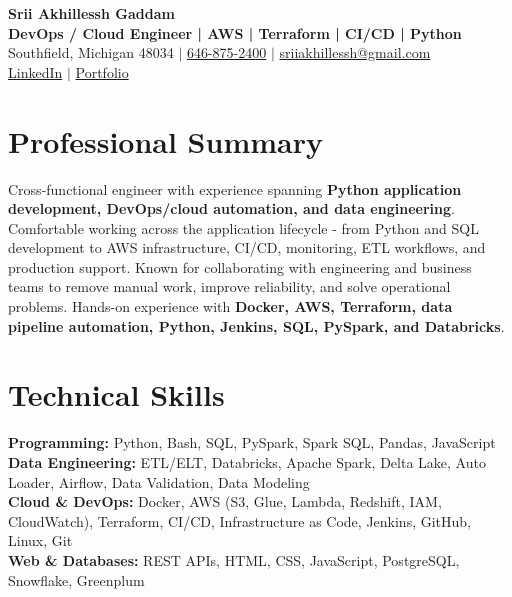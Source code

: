 \documentclass[letterpaper,10pt]{article}
\begin{document}
\fontsize{9.35pt}{10.45pt}\selectfont

\begin{center}
    {\LARGE \textbf{Srii Akhillessh Gaddam}} \\[-1pt]
    \textbf{DevOps / Cloud Engineer | AWS | Terraform | CI/CD | Python} \\[2pt]
    Southfield, Michigan 48034 $|$
    \href{tel:6468752400}{646-875-2400} $|$
    \href{mailto:sriiakhillessh@gmail.com}{sriiakhillessh@gmail.com} \\[1pt]
    \href{https://www.linkedin.com/in/srii-akhiilessh-gaddam-b48668191/}{LinkedIn} $|$
    \href{https://sriiakhillesshg.github.io/portfolio/}{Portfolio}
\end{center}
\vspace{-8pt}

\section{Professional Summary}
\small{Cross-functional engineer with experience spanning \textbf{Python application development, DevOps/cloud automation, and data engineering}. Comfortable working across the application lifecycle - from Python and SQL development to AWS infrastructure, CI/CD, monitoring, ETL workflows, and production support. Known for collaborating with engineering and business teams to remove manual work, improve reliability, and solve operational problems. Hands-on experience with \textbf{Docker, AWS, Terraform, data pipeline automation, Python, Jenkins, SQL, PySpark, and Databricks}.}

\section{Technical Skills}
\small{
\textbf{Programming:} Python, Bash, SQL, PySpark, Spark SQL, Pandas, JavaScript \\
\textbf{Data Engineering:} ETL/ELT, Databricks, Apache Spark, Delta Lake, Auto Loader, Airflow, Data Validation, Data Modeling \\
\textbf{Cloud \& DevOps:} Docker, AWS (S3, Glue, Lambda, Redshift, IAM, CloudWatch), Terraform, CI/CD, Infrastructure as Code, Jenkins, GitHub, Linux, Git \\
\textbf{Web \& Databases:} REST APIs, HTML, CSS, JavaScript, PostgreSQL, Snowflake, Greenplum
}
\end{document}
